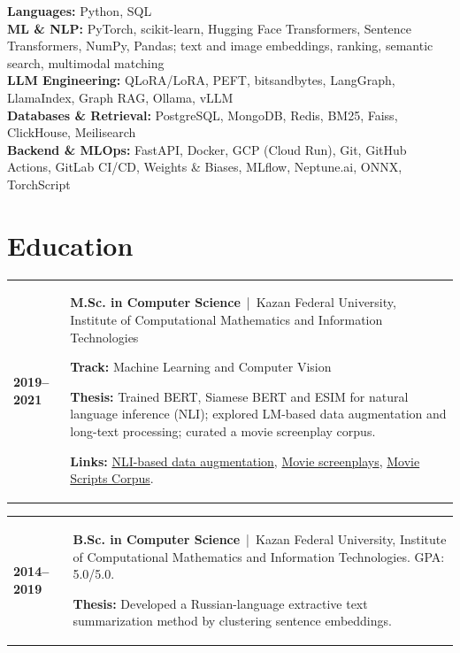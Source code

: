 \documentclass[12pt]{article}
\begin{document}
{\raggedright
\textbf{Languages:} Python, SQL\\[3pt]
\textbf{ML \& NLP:} PyTorch, scikit-learn, Hugging Face Transformers, Sentence Transformers, NumPy, Pandas; text and image embeddings, ranking, semantic search, multimodal matching\\[3pt]
\textbf{LLM Engineering:} QLoRA/LoRA, PEFT, bitsandbytes, LangGraph, LlamaIndex, Graph RAG, Ollama, vLLM\\[3pt]
\textbf{Databases \& Retrieval:} PostgreSQL, MongoDB, Redis, BM25, Faiss, ClickHouse, Meilisearch\\[3pt]
\textbf{Backend \& MLOps:} FastAPI, Docker, GCP (Cloud Run), Git, GitHub Actions, GitLab CI/CD, Weights \& Biases, MLflow, Neptune.ai, ONNX, TorchScript
\par}
\vspace{3pt}

\section*{Education}
\vspace{3pt}

\begin{tabularx}{\textwidth}{@{}l >{\RaggedRight\arraybackslash}X@{}}
\textbf{2019--2021} &

\textbf{M.Sc. in Computer Science} \,|\, Kazan Federal University, Institute of Computational Mathematics and Information Technologies
\par\vspace{3pt}
\textbf{Track:} Machine Learning and Computer Vision\par\vspace{1pt}
\textbf{Thesis:} Trained BERT, Siamese BERT and ESIM for natural language inference (NLI); explored LM-based data augmentation and long-text processing; curated a movie screenplay corpus.
\par\vspace{1pt}
\textbf{Links:}
\href{https://github.com/KseniaGu/NLI-based-augmentation}{\textcolor{blue!65!black}{NLI-based data augmentation}},
\href{https://github.com/KseniaGu/movie-screenplays/tree/main}{\textcolor{blue!65!black}{Movie screenplays}},
\href{https://www.kaggle.com/datasets/gufukuro/movie-scripts-corpus}{\textcolor{blue!65!black}{Movie Scripts Corpus}}.
\end{tabularx}

\vspace{5pt}
\begin{tabularx}{\textwidth}{@{}l >{\RaggedRight\arraybackslash}X@{}}
\textbf{2014--2019} &
\textbf{B.Sc. in Computer Science} \,|\, Kazan Federal University, Institute of Computational Mathematics and Information Technologies. GPA: 5.0/5.0.\par\vspace{3pt}
\textbf{Thesis:} Developed a Russian-language extractive text summarization method by clustering sentence embeddings.
\end{tabularx}
\end{document}
